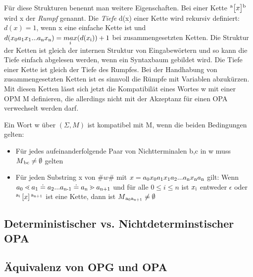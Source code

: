 Für diese Strukturen benennt man weitere Eigenschaften. Bei einer Kette $\textsuperscript{a} \big[ x \big] \textsuperscript{b}$ wird x der \textit{Rumpf} genannt. Die \textit{Tiefe} d(x) einer Kette wird rekursiv definiert: $d(x) = 1$, wenn x eine einfache Kette ist und $d(x\textsubscript{0}a\textsubscript{1} x\textsubscript{1}...a\textsubscript{n} x\textsubscript{n}) = \underset{i}{max}(d(x\textsubscript{i})) + 1$ bei zusammengesetzten Ketten. Die Struktur der Ketten ist gleich der internen Struktur von Eingabewörtern und so kann die Tiefe einfach abgelesen werden, wenn ein Syntaxbaum gebildet wird. Die Tiefe einer Kette ist gleich der Tiefe des Rumpfes. Bei der Handhabung von zusammengesetzten Ketten ist es sinnvoll die Rümpfe mit Variablen abzukürzen.\\
Mit diesen Ketten lässt sich jetzt die Kompatibilät eines Wortes w mit einer OPM M definieren, die allerdings nicht mit der Akzeptanz für einen OPA verwechselt werden darf.
\begin{definition}
Ein Wort w über $(\Sigma, M)$ ist kompatibel mit M, wenn die beiden Bedingungen gelten:
\begin{itemize}
\item
Für jedes aufeinanderfolgende Paar von Nichtterminalen b,c in w muss $M\textsubscript{bc}\neq \emptyset$ gelten
\item
Für jeden Substring x von $\# w\#$ mit $x=a\textsubscript{0}x\textsubscript{0}a\textsubscript{1}x\textsubscript{1}a\textsubscript{2}...a\textsubscript{n}x\textsubscript{n}a\textsubscript{n}$ gilt: Wenn $a\textsubscript{0} \lessdot a\textsubscript{1} \doteq a\textsubscript{2}...a\textsubscript{n-1} \doteq a\textsubscript{n} \gtrdot a\textsubscript{n+1}$ und für alle $0 \leq i \leq n$ ist $x\textsubscript{i}$ entweder $\epsilon$ oder $\textsuperscript{a\textsubscript{i}} \left[ x \right] \textsuperscript{a\textsubscript{n+1}}$ ist eine Kette, dann ist $M\textsubscript{a\textsubscript{0}a\textsubscript{n+1}} \neq \emptyset$
\end{itemize}
\end{definition}

\subsection{Deterministischer vs. Nichtdeterminstischer OPA}
\subsection{Äquivalenz von OPG und OPA}